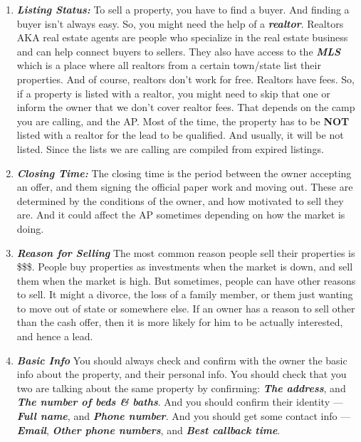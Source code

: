 \documentclass[12pt]{article}
\newcommand{\bb}[1]{\textbf{\textit{#1}}}
\begin{document}
\begin{enumerate}[label= \roman*.]
    \item \bb{Listing Status:}
    To sell a property, you have to find a buyer. And finding a buyer isn't always easy. So, you might need the help of a \bb{realtor}. Realtors AKA real estate agents are people who specialize in the real estate business and can help connect buyers to sellers. They also have access to the \bb{MLS} which is a place where all realtors from a certain town/state list their properties. And of course, realtors don't work for free. Realtors have fees. So, if a property is listed with a realtor, you might need to skip that one or inform the owner that we don't cover realtor fees. That depends on the camp you are calling, and the AP\@. Most of the time, the property has to be \textbf{NOT} listed with a realtor for the lead to be qualified. And usually, it will be not listed. Since the lists we are calling are compiled from expired listings.

\newpage

    \item \bb{Closing Time:}
    The closing time is the period between the owner accepting an offer, and them signing the official paper work and moving out. These are determined by the conditions of the owner, and how motivated to sell they are. And it could affect the AP sometimes depending on how the market is doing.
    
    \item \bb{Reason for Selling}
    The most common reason people sell their properties is \$\$\$. People buy properties as investments when the market is down, and sell them when the market is high. But sometimes, people can have other reasons to sell. It might a divorce, the loss of a family member, or them just wanting to move out of state or somewhere else. If an owner has a reason to sell other than the cash offer, then it is more likely for him to be actually interested, and hence a lead.

    \item \bb{Basic Info}
    You should always check and confirm with the owner the basic info about the property, and their personal info. You should check that you two are talking about the same property by confirming: \bb{The address}, and \bb{The number of beds \& baths}. And you should confirm their identity --- \bb{Full name}, and \bb{Phone number}. And you should get some contact info --- \bb{Email}, \bb{Other phone numbers}, and \bb{Best callback time}.
    
\end{enumerate}
\end{document}
